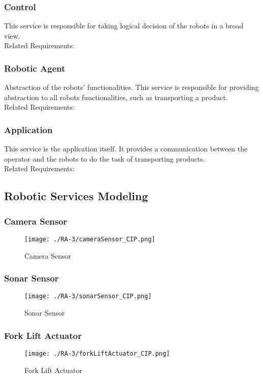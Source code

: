 \subsubsection*{Control}
This service is responsible for taking logical decision of the robots in a broad view.
\\Related Requirements:

\subsubsection*{Robotic Agent}
Abstraction of the robots' functionalities. This service is responsible for providing abstraction to all robots functionalities, such as transporting a product.%
\\Related Requirements:

\subsubsection*{Application}
This service is the application itself. It provides a communication between the operator and the robots to do the task of transporting products.
\\Related Requirements:

\subsection{Robotic Services Modeling}
\subsubsection{Camera Sensor} %
\begin{figure}[ht!]
 \centering
 \texttt{[image: ./RA-3/cameraSensor\_CIP.png]}
 \caption{Camera Sensor}
 \label{fig:camerasensor_cip}
\end{figure}

\subsubsection{Sonar Sensor} %
\begin{figure}[ht!]
 \centering
 \texttt{[image: ./RA-3/sonarSensor\_CIP.png]}
 \caption{Sonar Sensor}
 \label{fig:sonarsensor_cip}
\end{figure}

\subsubsection{Fork Lift Actuator} %
\begin{figure}[ht!]
 \centering
 \texttt{[image: ./RA-3/forkLiftActuator\_CIP.png]}
 \caption{Fork Lift Actuator}
 \label{fig:forkliftactuator_cip}
\end{figure}

